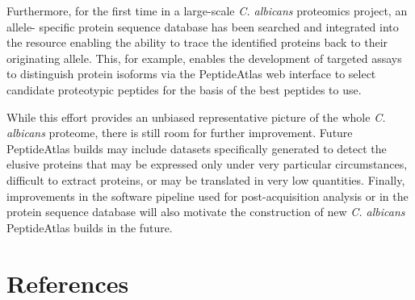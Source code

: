 Furthermore, for the first time in a large-scale \textit{C. albicans} proteomics project, an allele-
specific protein sequence database has been searched and integrated into the resource
enabling the ability to trace the identified proteins back to their originating allele. This, for
example, enables the development of targeted assays to distinguish protein isoforms via the
PeptideAtlas web interface \citep{Farrah2011} to select candidate proteotypic peptides for the basis of the
best peptides to use.

While this effort provides an unbiased representative picture of the whole \textit{C. albicans}
proteome, there is still room for further improvement. Future PeptideAtlas builds may include
datasets specifically generated to detect the elusive proteins that may be expressed only
under very particular circumstances, difficult to extract proteins, or may be translated in very
low quantities. Finally, improvements in the software pipeline used for post-acquisition
analysis or in the protein sequence database will also motivate the construction of new
\textit{C. albicans} PeptideAtlas builds in the future.











\section*{References}

